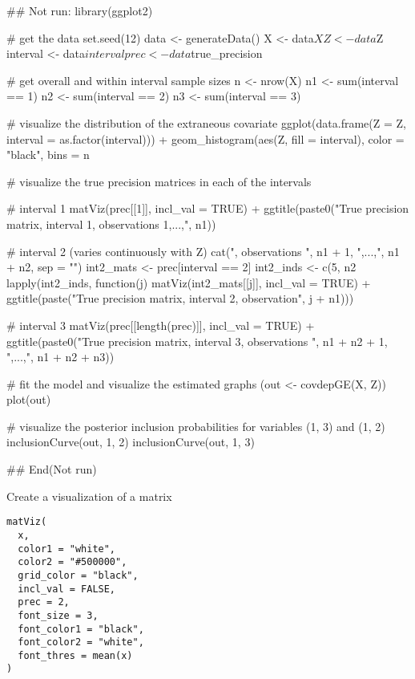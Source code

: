 \documentclass[a4paper]{book}
\begin{document}
\begin{Examples}
\begin{ExampleCode}
## Not run: 
library(ggplot2)

# get the data
set.seed(12)
data <- generateData()
X <- data$X
Z <- data$Z
interval <- data$interval
prec <- data$true_precision

# get overall and within interval sample sizes
n <- nrow(X)
n1 <- sum(interval == 1)
n2 <- sum(interval == 2)
n3 <- sum(interval == 3)

# visualize the distribution of the extraneous covariate
ggplot(data.frame(Z = Z, interval = as.factor(interval))) +
  geom_histogram(aes(Z, fill = interval), color = "black", bins = n %

# visualize the true precision matrices in each of the intervals

# interval 1
matViz(prec[[1]], incl_val = TRUE) +
  ggtitle(paste0("True precision matrix, interval 1, observations 1,...,", n1))

# interval 2 (varies continuously with Z)
cat(", observations ", n1 + 1, ",...,", n1 + n2, sep = "")
int2_mats <- prec[interval == 2]
int2_inds <- c(5, n2 %
lapply(int2_inds, function(j) matViz(int2_mats[[j]], incl_val = TRUE) +
         ggtitle(paste("True precision matrix, interval 2, observation", j + n1)))

# interval 3
matViz(prec[[length(prec)]], incl_val = TRUE) +
  ggtitle(paste0("True precision matrix, interval 3, observations ",
                 n1 + n2 + 1, ",...,", n1 + n2 + n3))

# fit the model and visualize the estimated graphs
(out <- covdepGE(X, Z))
plot(out)

# visualize the posterior inclusion probabilities for variables (1, 3) and (1, 2)
inclusionCurve(out, 1, 2)
inclusionCurve(out, 1, 3)

## End(Not run)
\end{ExampleCode}
\end{Examples}
%
\begin{Description}\relax
Create a visualization of a matrix
\end{Description}
%
\begin{Usage}
\begin{verbatim}
matViz(
  x,
  color1 = "white",
  color2 = "#500000",
  grid_color = "black",
  incl_val = FALSE,
  prec = 2,
  font_size = 3,
  font_color1 = "black",
  font_color2 = "white",
  font_thres = mean(x)
)
\end{verbatim}
\end{Usage}
\end{document}
